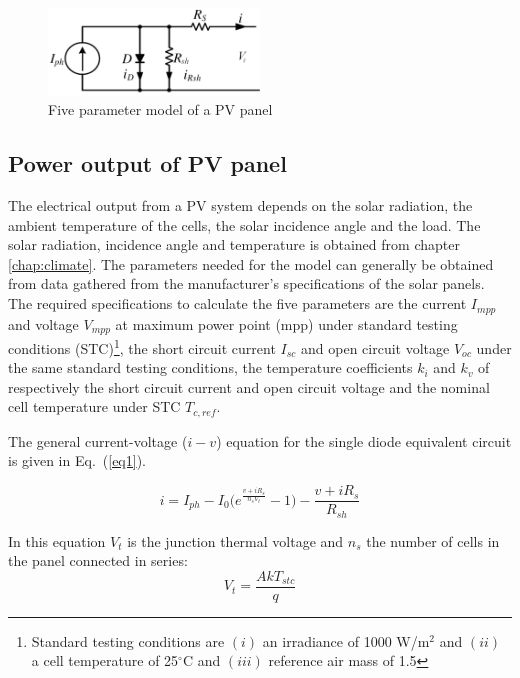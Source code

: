 \begin{figure}[ht]
\centerline{\includegraphics[width=0.5\textwidth]{Electric/MyGraphics/5param_eq.png}}
\label{fig:5param_equiv}
\caption{Five parameter model of a PV panel~\cite{desoto}} 
\end{figure}

\subsection{Power output of PV panel}
The electrical output from a PV system depends on the solar radiation, the ambient temperature of the cells, the solar incidence angle and the load. The solar radiation, incidence angle and temperature is obtained from chapter \ref{chap:climate}. The parameters needed for the model can generally be obtained from data gathered from the manufacturer's specifications of the solar panels. The required specifications to calculate the five parameters are the current $I_{mpp}$ and voltage $V_{mpp}$ at maximum power point (mpp) under standard testing conditions (STC)\footnote{Standard testing conditions are $(i)$ an irradiance of 1000 W/m$^2$ and $(ii)$ a cell temperature of 25$^\circ$C and $(iii)$ reference air mass of 1.5}, the short circuit current $I_{sc}$ and open circuit voltage $V_{oc}$ under the same standard testing conditions, the temperature coefficients $k_{i}$ and $k_{v}$ of respectively the short circuit current and open circuit voltage and the nominal cell temperature under STC $T_{c,ref}$.

The general current-voltage ($i-v$) equation for the single diode equivalent circuit is given in Eq.~(\ref{eq1}). 

\begin{equation}
i = I_{ph} - I_{0} \biggl(e^{\frac{v + i R_{s}}{n_{s} V_{t}}} - 1 \biggr) - \frac{v + i R_{s}}{R_{sh}}
\label{eq1}
\end{equation}

In this equation $V_{t}$ is the junction thermal voltage and $n_{s}$ the number of cells in the panel connected in series:
\begin{equation}
V_t = \frac{A k T_{stc}}{q}
\label{eqVt}
\end{equation}

